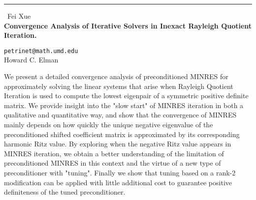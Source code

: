 \documentclass{report}
\begin{document}
\begin{center}
\rule{6in}{1pt} \
{\large Fei Xue \\
{\bf Convergence Analysis of Iterative Solvers in Inexact Rayleigh Quotient Iteration.
}}

{\tt petrinet@math.umd.edu}\\
Howard C. Elman
\end{center}

We present a detailed convergence analysis of preconditioned
MINRES for approximately solving the linear
systems that arise when Rayleigh Quotient Iteration is used to compute the
lowest eigenpair of a symmetric positive definite
matrix. We provide insight into the "slow start" of MINRES iteration in
both a qualitative and quantitative way, and show
that the convergence of MINRES mainly depends on how quickly the unique
negative eigenvalue of the preconditioned shifted
coefficient matrix is approximated by its corresponding harmonic Ritz
value. By exploring when the negative Ritz value
appears in MINRES iteration, we obtain a better understanding of the
limitation of preconditioned MINRES in this context
and the virtue of a new type of preconditioner with "tuning". Finally we
show that tuning based on a rank-2 modification
can be applied with little additional cost to guarantee positive
definiteness of the tuned preconditioner.
\end{document}
